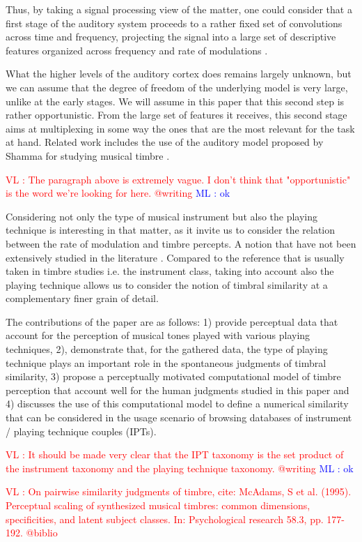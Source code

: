 \documentclass{article}
\makeatletter
\newcommand*{\ie}{i.e.\@\xspace}
\newcommand{\ipts}{IPTs\xspace}
\newcommand{\ml}[1]{\textcolor{blue}{ML : #1}}
\newcommand{\vl}[1]{\textcolor{red}{VL : #1}}
\makeatother
\begin{document}
Thus, by taking a signal processing view of the matter, one could consider that a first stage of the auditory system proceeds to a rather fixed set of convolutions across time and frequency, projecting the signal into a large set of descriptive features organized across frequency and rate of modulations \cite{anden2014deep}.

What the higher levels of the auditory cortex does remains largely unknown, but we can assume that the degree of freedom of the underlying model is very large, unlike at the early stages. 
We will assume in this paper that this second step is rather opportunistic. From the large set of features it receives, this second stage aims at multiplexing in some way the ones that are the most relevant for the task at hand.
Related work includes the use of the auditory model proposed by Shamma for studying musical timbre \cite{patil2012music}.

\vl{The paragraph above is extremely vague. I don't think that "opportunistic" is the word we're looking for here. @writing}
\ml{ok}

Considering not only the type of musical instrument but also the playing technique is interesting in that matter, as it invite us to consider the relation between the rate of modulation and timbre percepts.
A notion that have not been extensively studied in the literature \cite{burred2010dynamic}.
Compared to the reference that is usually taken in timbre studies \ie{} the instrument class, taking into account also the playing technique allows us to consider the notion of timbral similarity at a complementary finer grain of detail.

The contributions of the paper are as follows:
1) provide perceptual data that account for the perception of musical tones played with various playing techniques, 2), demonstrate that, for the gathered data, the type of playing technique plays an important role in the spontaneous judgments of timbral similarity, 3) propose a perceptually motivated computational model of timbre perception that account well for the human judgments studied in this paper and 4) discusses the use of this computational model to define a numerical similarity that can be considered in the usage scenario of browsing databases of instrument / playing technique couples (\ipts).

\vl{It should be made very clear that the IPT taxonomy is
the set product of the instrument taxonomy
and the playing technique taxonomy. @writing}
\ml{ok}

\vl{On pairwise similarity judgments of timbre, cite:
McAdams, S et al. (1995). Perceptual scaling of synthesized musical
timbres: common dimensions, specificities, and latent subject
classes. In: Psychological research 58.3, pp. 177-192.
@biblio}
\end{document}
